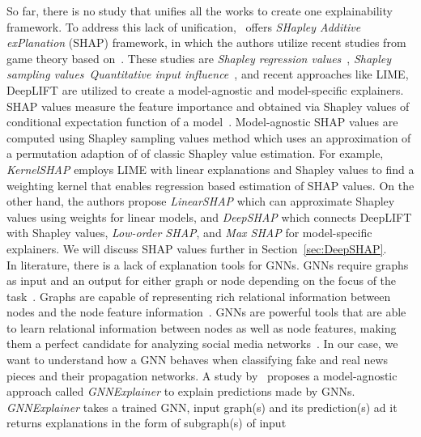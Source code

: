 So far, there is no study that unifies all the works to create one explainability framework. To address this lack of unification,~\cite{AUnifiedApproach_Lundberg} offers \emph{SHapley Additive exPlanation} (SHAP) framework, in which the authors utilize recent studies from game theory based on~\parencite{GameTheory_Shapley}. These studies are \emph{Shapley regression values}~\parencite{AnalysisOfRegressionInGameTheory_Lipovetsky}, \emph{Shapley sampling values}~\parencite{ExplainingPredictionModels_Strumbelj}\emph{Quantitative input influence}~\parencite{AlgorithmicTransparencyViaQuantitativeInputInfluence_Datta}, and recent approaches like LIME, DeepLIFT are utilized to create a model-agnostic and model-specific explainers. SHAP values measure the feature importance and obtained via Shapley values of conditional expectation function of a model~\parencite{AUnifiedApproach_Lundberg}. Model-agnostic SHAP values are computed using Shapley sampling values method which uses an approximation of a permutation adaption of of classic Shapley value estimation. For example, \emph{KernelSHAP} employs LIME with linear explanations and Shapley values to find a weighting kernel that enables regression based estimation of SHAP values. On the other hand, the authors propose \emph{LinearSHAP} which can approximate Shapley values using weights for linear models, and \emph{DeepSHAP} which connects DeepLIFT with Shapley values, \emph{Low-order SHAP}, and \emph{Max SHAP} for model-specific explainers. We will discuss SHAP values further in Section~\ref{sec:DeepSHAP}.\\
In literature, there is a lack of explanation tools for GNNs. GNNs require graphs as input and an output for either graph or node depending on the focus of the task~\parencite{DeepLearningOnGraphs_Zhang}. Graphs are capable of representing rich relational information between nodes and the node feature
information~\parencite{DeepLearningOnGraphs_Zhang, GNNsAReview_Zhou}. GNNs are powerful tools that are able to learn relational information between nodes as well as node features, making them a perfect candidate for analyzing social media networks~\parencite{BeyondSigmoids_Zang}. In our case, we want to understand how a GNN behaves when classifying fake and real news pieces and their propagation networks. A study by~\cite{GNNExplainer_Ying} proposes a model-agnostic approach called \emph{GNNExplainer} to explain predictions made by GNNs. \emph{GNNExplainer} takes a trained GNN, input graph(s) and its prediction(s) ad it returns explanations in the form of subgraph(s) of input
